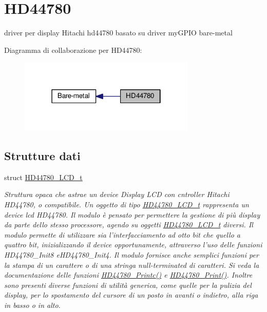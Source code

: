 \hypertarget{group___h_d44780}{\section{H\+D44780}
\label{group___h_d44780}
}


driver per display Hitachi hd44780 basato su driver my\+G\+P\+I\+O bare-\/metal  


Diagramma di collaborazione per H\+D44780\+:\nopagebreak
\begin{figure}[H]
\begin{center}
\leavevmode
\includegraphics[width=238pt]{group___h_d44780}
\end{center}
\end{figure}
\subsection*{Strutture dati}
\begin{DoxyCompactItemize}
\item 
struct \hyperlink{struct_h_d44780___l_c_d__t}{H\+D44780\+\_\+\+L\+C\+D\+\_\+t}
\begin{DoxyCompactList}\small\item\em Struttura opaca che astrae un device Display L\+C\+D con cntroller Hitachi H\+D44780, o compatibile. Un oggetto di tipo \hyperlink{struct_h_d44780___l_c_d__t}{H\+D44780\+\_\+\+L\+C\+D\+\_\+t} rappresenta un device lcd H\+D44780. Il modulo è pensato per permettere la gestione di più display da parte dello stesso processore, agendo su oggetti \hyperlink{struct_h_d44780___l_c_d__t}{H\+D44780\+\_\+\+L\+C\+D\+\_\+t} diversi. Il modulo permette di utilizzare sia l'interfacciamento ad otto bit che quello a quattro bit, inizializzando il device opportunamente, attraverso l'uso delle funzioni H\+D44780\+\_\+\+Init8 e\+H\+D44780\+\_\+\+Init4. Il modulo fornisce anche semplici funzioni per la stampa di un carattere o di una stringa null-\/terminated di caratteri. Si veda la documentazione delle funzioni \hyperlink{group___h_d44780_ga57b8c6ca0b3c12e5f7273b3c373a6f17}{H\+D44780\+\_\+\+Printc()} e \hyperlink{group___h_d44780_ga3aedff8e2040e62db569fde955d3987b}{H\+D44780\+\_\+\+Print()}. Inoltre sono presenti diverse funzioni di utilità generica, come quelle per la pulizia del display, per lo spostamento del cursore di un posto in avanti o indietro, alla riga in basso o in alto. \end{DoxyCompactList}\end{DoxyCompactItemize}
